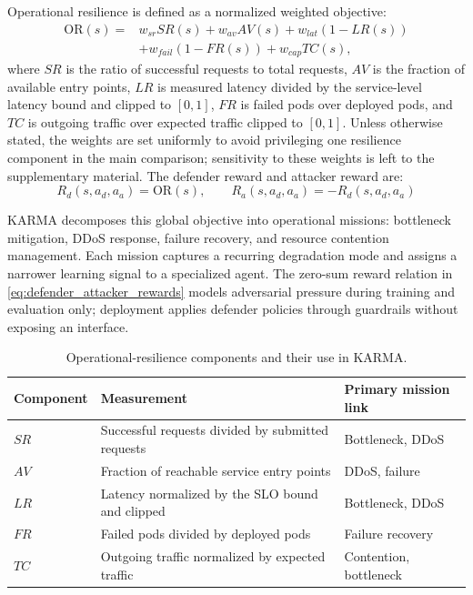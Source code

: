 \documentclass[journal]{IEEEtran}
\newcommand{\orfunc}{\mathrm{OR}}
\begin{document}
Operational resilience is defined as a normalized weighted objective:
\begin{align}
  \orfunc(s)= & w_{sr}SR(s)+w_{av}AV(s)+w_{lat}(1-LR(s)) \nonumber \\
              & +w_{fail}(1-FR(s))+w_{cap}TC(s),
  \label{eq:or}
\end{align}
where $SR$ is the ratio of successful requests to total requests, $AV$ is the fraction of available entry points, $LR$ is measured latency divided by the service-level latency bound and clipped to $[0,1]$, $FR$ is failed pods over deployed pods, and $TC$ is outgoing traffic over expected traffic clipped to $[0,1]$. Unless otherwise stated, the weights are set uniformly to avoid privileging one resilience component in the main comparison; sensitivity to these weights is left to the supplementary material. The defender reward and attacker reward are:
\begin{equation}
  R_d(s,a_d,a_a)=\orfunc(s), \qquad
  R_a(s,a_d,a_a)=-R_d(s,a_d,a_a)
  \label{eq:defender_attacker_rewards}
\end{equation}

KARMA decomposes this global objective into operational missions: bottleneck mitigation, DDoS response, failure recovery, and resource contention management. Each mission captures a recurring degradation mode and assigns a narrower learning signal to a specialized agent. The zero-sum reward relation in \autoref{eq:defender_attacker_rewards} models adversarial pressure during training and evaluation only; deployment applies defender policies through guardrails without exposing an interface.

\begin{table}[t]
  \centering
  \caption{Operational-resilience components and their use in KARMA.}
  \label{tab:or_components}
  \scriptsize
  \setlength{\tabcolsep}{3pt}
  \renewcommand{\arraystretch}{1.05}
  \begin{tabularx}{\columnwidth}{lXl}
    \toprule
    \textbf{Component} & \textbf{Measurement}                              & \textbf{Primary mission link} \\
    \midrule
    $SR$               & Successful requests divided by submitted requests & Bottleneck, DDoS              \\
    $AV$               & Fraction of reachable service entry points        & DDoS, failure                 \\
    $LR$               & Latency normalized by the SLO bound and clipped   & Bottleneck, DDoS              \\
    $FR$               & Failed pods divided by deployed pods              & Failure recovery              \\
    $TC$               & Outgoing traffic normalized by expected traffic   & Contention, bottleneck        \\
    \bottomrule
  \end{tabularx}
\end{table}
\end{document}
